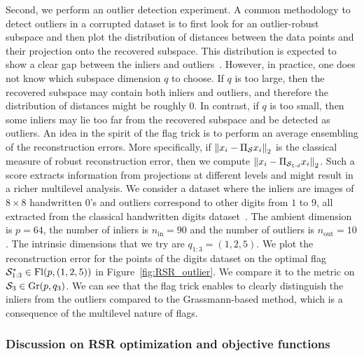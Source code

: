 Second, we perform an outlier detection experiment. A common methodology to detect outliers in a corrupted dataset is to first look for an outlier-robust subspace and then plot the distribution of distances between the data points and their projection onto the recovered subspace. This distribution is expected to show a clear gap between the inliers and outliers~\citep[Fig.~3.7]{vidal_generalized_2016}.
However, in practice, one does not know which subspace dimension $q$ to choose. If $q$ is too large, then the recovered subspace may contain both inliers and outliers, and therefore the distribution of distances might be roughly $0$. In contrast, if $q$ is too small, then some inliers may lie too far from the recovered subspace and be detected as outliers. An idea in the spirit of the flag trick is to perform an average ensembling of the reconstruction errors. More specifically, if $\left\lVert x_i - \Pi_{\mathcal{S}} x_i\right\rVert_2$ is the classical measure of robust reconstruction error, then we compute $\left\lVert x_i - \Pi_{\mathcal{S}_{1:d}} x_i\right\rVert_2$. Such a score extracts information from projections at different levels and might result in a richer multilevel analysis.
We consider a dataset where the inliers are images of $8 \times 8$ handwritten $0$'s and outliers correspond to other digits from $1$ to $9$, all extracted from the classical handwritten digits dataset~\citep{alpaydin_optical_1998}.
The ambient dimension is $p = 64$, the number of inliers is $n_\mathrm{in} = 90$ and the number of outliers is $n_\mathrm{out} = 10$. The intrinsic dimensions that we try are $q_{1:3} = (1, 2, 5)$.
We plot the reconstruction error for the points of the digits dataset on the optimal flag $\mathcal{S}_{1:3}^* \in \operatorname{Fl}(p, (1, 2, 5))$ in Figure~\ref{fig:RSR_outlier}. We compare it to the metric on $\mathcal{S}_3 \in \operatorname{Gr}(p, q_3)$.
We can see that the flag trick enables to clearly distinguish the inliers from the outliers compared to the Grassmann-based method, which is a consequence of the multilevel nature of flags.


\subsubsection{Discussion on RSR optimization and objective functions}\label{subsubsec:RSR_discu}
